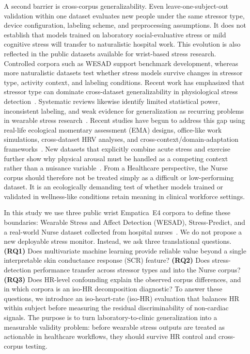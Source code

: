 \documentclass[healthcare,article,submit,moreauthors,pdftex]{Definitions/mdpi}
\begin{document}
A second barrier is cross-corpus generalizability. Even leave-one-subject-out
validation within one dataset evaluates new people under the same stressor type,
device configuration, labeling scheme, and preprocessing assumptions. It does not
establish that models trained on laboratory social-evaluative stress or mild
cognitive stress will transfer to naturalistic hospital work. This evolution is
also reflected in the public datasets available for wrist-based stress research.
Controlled corpora such as WESAD support benchmark development, whereas more
naturalistic datasets test whether stress models survive changes in stressor
type, activity context, and labeling conditions. Recent work has emphasized that
stressor type can dominate cross-dataset generalizability in physiological stress
detection~\cite{prajod2024}. Systematic reviews likewise identify limited
statistical power, inconsistent labeling, and weak evidence for generalization as
recurring problems in wearable stress research~\cite{vos2023generalizable}.
Recent studies have begun to address this gap using real-life ecological
momentary assessment (EMA) designs, office-like work simulations, cross-dataset
HRV analyses, and cross-context/domain-adaptation
frameworks~\cite{tutunji2023prolonged,naegelin2023interpretable,
benchekroun2023crossdataset,mihirette2025crosscontextual}. New datasets that
explicitly combine acute stress and exercise further show why physical arousal
must be handled as a competing context rather than a nuisance
variable~\cite{hongn2025wearable}. From a Healthcare perspective, the Nurse
corpus should therefore not be treated simply as a difficult or low-performing
dataset. It is an ecologically demanding test of whether models trained or
validated in wellness-like conditions retain meaning in clinical workforce
settings.

In this study we use three public wrist Empatica~E4 corpora to define these
boundaries: Wearable Stress and Affect Detection (WESAD), Stress-Predict, and a
real-world Nurse dataset collected from hospital
nurses~\cite{schmidt2018wesad,talukdar2022stresspredict,hosseini2022nurse}. We
do not propose a new deployable stress monitor. Instead, we ask three
translational questions. \textbf{(RQ1)} Does multivariate machine learning
provide reliable value beyond a single interpretable skin conductance response
(SCR) feature?
\textbf{(RQ2)} Does stress-detection performance transfer across stressor types
and into the Nurse corpus? \textbf{(RQ3)} Does HR-level confounding explain the
observed corpus differences, and in which corpora is an iso-HR decomposition
diagnostic? To
answer these questions, we introduce an iso-heart-rate (iso-HR) evaluation that
balances HR within subject before measuring the residual discriminability of
non-cardiac signals. The purpose is to turn laboratory-to-clinic generalization
into a measurable validity problem: before wearable stress outputs are treated as
actionable in healthcare workflows, they should survive HR control and
cross-corpus testing.
\end{document}
